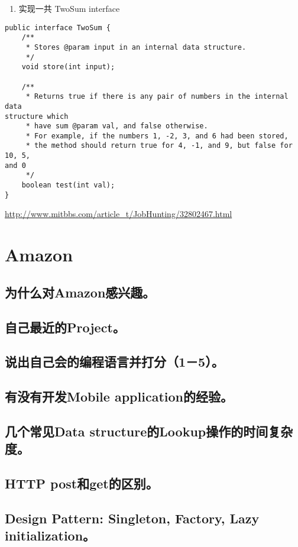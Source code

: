 \documentclass[12pt]{book}
\begin{document}
\begin{enumerate}
\item 实现一共 TwoSum interface
\end{enumerate}
\lstset{language=java,label= ,caption= ,numbers=none}
\begin{lstlisting}
public interface TwoSum {
    /**
     * Stores @param input in an internal data structure.
     */
    void store(int input);

    /**
     * Returns true if there is any pair of numbers in the internal data 
structure which
     * have sum @param val, and false otherwise.
     * For example, if the numbers 1, -2, 3, and 6 had been stored,
     * the method should return true for 4, -1, and 9, but false for 10, 5, 
and 0
     */
    boolean test(int val);
}
\end{lstlisting}
\url{http://www.mitbbs.com/article_t/JobHunting/32802467.html}

\chapter{Amazon}
\label{sec-17}
\section{为什么对Amazon感兴趣。}
\label{sec-17-1}
\section{自己最近的Project。}
\label{sec-17-2}
\section{说出自己会的编程语言并打分（1－5）。}
\label{sec-17-3}
\section{有没有开发Mobile application的经验。}
\label{sec-17-4}
\section{几个常见Data structure的Lookup操作的时间复杂度。}
\label{sec-17-5}
\section{HTTP post和get的区别。}
\label{sec-17-6}
\section{Design Pattern: Singleton, Factory, Lazy initialization。}
\label{sec-17-7}
\end{document}
